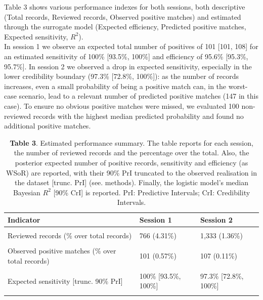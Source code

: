 \documentclass{article}
\begin{document}
Table 3 shows various performance indexes for both sessions, both
descriptive (Total records, Reviewed records, Observed positive matches)
and estimated through the surrogate model (Expected efficiency,
Predicted positive matches, Expected sensitivity, \(R^2\)).\\
In session 1 we observe an expected total number of positives of 101
{[}101, 108{]} for an estimated sensitivity of 100\% {[}93.5\%, 100\%{]}
and efficiency of 95.6\% {[}95.3\%, 95.7\%{]}. In session 2 we observed
a drop in expected sensitivity, especially in the lower credibility
boundary (97.3\% {[}72.8\%, 100\%{]}): as the number of records
increases, even a small probability of being a positive match can, in
the worst-case scenario, lead to a relevant number of predicted positive
matches (147 in this case). To ensure no obvious positive matches were
missed, we evaluated 100 non-reviewed records with the highest median
predicted probability and found no additional positive matches.\\

\begin{table}[!h]

\caption{\label{tab:Table 3}\textbf{Table 3}. Estimated performance summary. The table reports for each session, the number of reviewed records and the percentage over the total. Also, the posterior expected number of positive records, sensitivity and efficiency (as WSoR) are reported, with their 90\% PrI truncated to the observed realisation in the dataset [trunc. PrI] (see. methods). Finally, the logistic model's median Bayesian $R^2$ [90\% CrI] is reported. PrI: Predictive Intervals; CrI: Credibility Intervals.}
\centering
\begin{tabular}[t]{lll}
\toprule
Indicator & Session 1 & Session 2\\
\midrule
\cellcolor{gray!6}{Total records} & \cellcolor{gray!6}{17,755} & \cellcolor{gray!6}{98,371}\\
Reviewed records (\% over total records) & 766 (4.31\%) & 1,333 (1.36\%)\\
\cellcolor{gray!6}{Expected efficiency (over random) [trunc. 90\% PrI]} & \cellcolor{gray!6}{95.6\% [95.3\%, 95.7\%]} & \cellcolor{gray!6}{98.6\% [98.1\%, 98.6\%]}\\
Observed positive matches (\% over total records) & 101 (0.57\%) & 107 (0.11\%)\\
\cellcolor{gray!6}{Predicted positive matches [trunc. 90\% PrI]} & \cellcolor{gray!6}{101 [101, 108]} & \cellcolor{gray!6}{110 [107, 147]}\\
\addlinespace
Expected sensitivity [trunc. 90\% PrI] & 100\% [93.5\%, 100\%] & 97.3\% [72.8\%, 100\%]\\
\cellcolor{gray!6}{Simple Model $R^2$ [90\% CrI]} & \cellcolor{gray!6}{98.1\% [97.4\%, 98.3\%]} & \cellcolor{gray!6}{98.2\% [97.6\%, 98.3\%]}\\
\bottomrule
\end{tabular}
\end{table}
\end{document}
